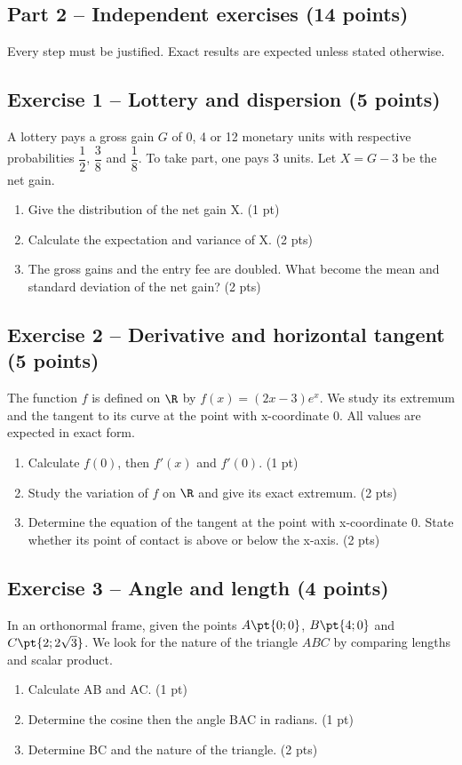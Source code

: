 \mxnewpage\subsection*{Part 2 -- Independent exercises (14 points)}
Every step must be justified. Exact results are expected unless stated otherwise.
\subsection*{Exercise 1 -- Lottery and dispersion (5 points)}
A lottery pays a gross gain $G$ of 0, 4 or 12 monetary units with respective probabilities $\dfrac12$, $\dfrac38$ and $\dfrac18$. To take part, one pays 3 units. Let $X=G-3$ be the net gain.
\begin{enumerate}
\item Give the distribution of the net gain X. \hfill(1 pt)
\item Calculate the expectation and variance of X. \hfill(2 pts)
\item The gross gains and the entry fee are doubled. What become the mean and standard deviation of the net gain? \hfill(2 pts)
\end{enumerate}
\subsection*{Exercise 2 -- Derivative and horizontal tangent (5 points)}
The function $f$ is defined on $\R$ by $f(x)=(2x-3)e^x$. We study its extremum and the tangent to its curve at the point with x-coordinate 0. All values are expected in exact form.
\begin{enumerate}
\item Calculate $f(0)$, then $f\prime(x)$ and $f\prime(0)$. \hfill(1 pt)
\item Study the variation of $f$ on $\R$ and give its exact extremum. \hfill(2 pts)
\item Determine the equation of the tangent at the point with x-coordinate 0. State whether its point of contact is above or below the x-axis. \hfill(2 pts)
\end{enumerate}
\subsection*{Exercise 3 -- Angle and length (4 points)}
In an orthonormal frame, given the points $A\pt{0;0}$, $B\pt{4;0}$ and $C\pt{2;2\sqrt3}$. We look for the nature of the triangle $ABC$ by comparing lengths and scalar product.
\begin{enumerate}
\item Calculate AB and AC. \hfill(1 pt)
\item Determine the cosine then the angle BAC in radians. \hfill(1 pt)
\item Determine BC and the nature of the triangle. \hfill(2 pts)
\end{enumerate}
